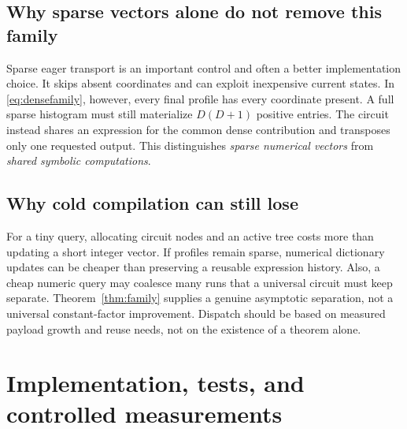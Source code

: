 \documentclass[11pt]{article}
\theoremstyle{definition}\newtheorem{definition}[theorem]{Definition}
\theoremstyle{remark}\newtheorem{remark}[theorem]{Remark}
\begin{document}
\subsection{Why sparse vectors alone do not remove this family}
Sparse eager transport is an important control and often a better implementation
choice. It skips absent coordinates and can exploit inexpensive current states.
In \eqref{eq:densefamily}, however, every final profile has every coordinate
present. A full sparse histogram must still materialize $D(D+1)$ positive entries.
The circuit instead shares an expression for the common dense contribution and
transposes only one requested output. This distinguishes \emph{sparse numerical
vectors} from \emph{shared symbolic computations}.

\subsection{Why cold compilation can still lose}
For a tiny query, allocating circuit nodes and an active tree costs more than
updating a short integer vector. If profiles remain sparse, numerical dictionary
updates can be cheaper than preserving a reusable expression history. Also,
a cheap numeric query may coalesce many runs that a universal circuit must keep
separate. Theorem~\ref{thm:family} supplies a genuine asymptotic separation, not a
universal constant-factor improvement. Dispatch should be based on measured
payload growth and reuse needs, not on the existence of a theorem alone.

\section{Implementation, tests, and controlled measurements}
\label{sec:experiments}
\end{document}
